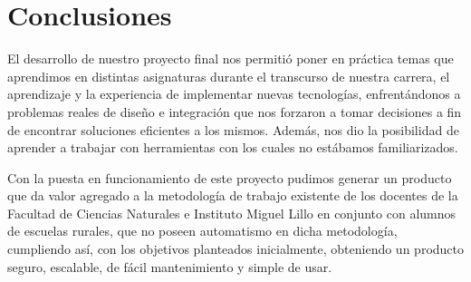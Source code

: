 
\chapter{Conclusiones}

El desarrollo de nuestro proyecto final nos permitió poner en práctica temas que aprendimos en distintas asignaturas durante el transcurso de nuestra carrera, el aprendizaje y la experiencia de implementar nuevas tecnologías, enfrentándonos a problemas reales de diseño e integración que nos forzaron a tomar decisiones a fin de encontrar soluciones eficientes a los mismos. Además, nos dio la posibilidad de aprender a trabajar con herramientas con los cuales no estábamos familiarizados.

Con la puesta en funcionamiento de este proyecto pudimos generar un producto que
da valor agregado a la metodología de trabajo existente de los docentes de la Facultad de Ciencias Naturales e Instituto Miguel Lillo en conjunto con alumnos de escuelas rurales, que no poseen automatismo en dicha metodología, cumpliendo así, con los objetivos planteados inicialmente, obteniendo un producto seguro, escalable, de fácil mantenimiento y simple de usar.

